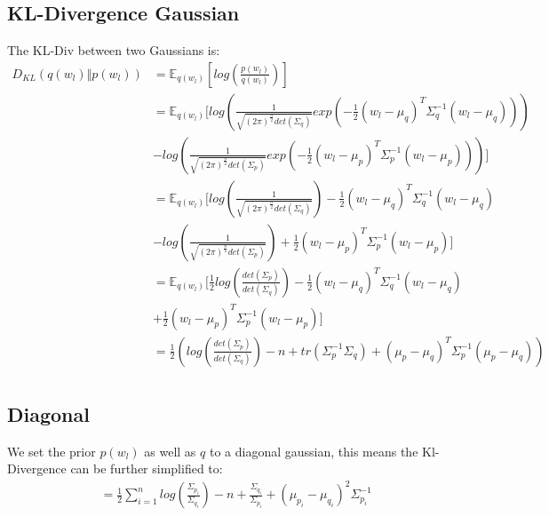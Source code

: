 \documentclass[a4paper]{scrartcl}
\begin{document}
  \subsection{KL-Divergence Gaussian}
    The KL-Div between two Gaussians is:
    \begin{align*}
      D_{KL}(q(w_l) \Vert p(w_l))
      &= \mathbb{E}_{q(w_l)} [log(\frac{p(w_l)}{q(w_l)})] \\
      &= \mathbb{E}_{q(w_l)} [log(\frac{1}{\sqrt{(2 \pi)^{\frac{n}{2}} det(\Sigma_q)}} exp(-\frac{1}{2} (w_l - \mu_q)^T \Sigma^{-1}_q (w_l - \mu_q)))\\
      &- log(\frac{1}{\sqrt{(2 \pi)^{\frac{n}{2}} det(\Sigma_p)}} exp(-\frac{1}{2} (w_l - \mu_p)^T \Sigma^{-1}_p (w_l - \mu_p)))] \\
      &= \mathbb{E}_{q(w_l)} [log(\frac{1}{\sqrt{(2 \pi)^{\frac{n}{2}} det(\Sigma_q)}}) -\frac{1}{2} (w_l - \mu_q)^T \Sigma^{-1}_q (w_l - \mu_q)\\
      &- log(\frac{1}{\sqrt{(2 \pi)^{\frac{n}{2}} det(\Sigma_p)}}) + \frac{1}{2} (w_l - \mu_p)^T \Sigma^{-1}_p (w_l - \mu_p)] \\
      &= \mathbb{E}_{q(w_l)} [\frac{1}{2}log(\frac{det(\Sigma_p)}{det(\Sigma_q)}) -\frac{1}{2} (w_l - \mu_q)^T \Sigma^{-1}_q (w_l - \mu_q)\\
      & + \frac{1}{2} (w_l - \mu_p)^T \Sigma^{-1}_p (w_l - \mu_p)] \\
      &= \frac{1}{2}(log(\frac{det(\Sigma_p)}{det(\Sigma_q)}) -n + tr(\Sigma^{-1}_p \Sigma_q ) + (\mu_p - \mu_q)^T \Sigma^{-1}_p (\mu_p - \mu_q))\\
  \end{align*}

  \subsection{Diagonal}
      We set the prior $p(w_l)$ as well as $q$ to a diagonal gaussian, this
      means the Kl-Divergence can be further simplified to:
      \begin{align}
          &= \frac{1}{2} \sum_{i=1}^n log(\frac{ \Sigma_{p_i}}{\Sigma_{q_i}}) - n + \frac{\Sigma_{q_i}}{\Sigma_{p_i}}  +  (\mu_{p_i} - \mu_{q_i})^2 \Sigma^{-1}_{p_i}
      \end{align}
\end{document}
